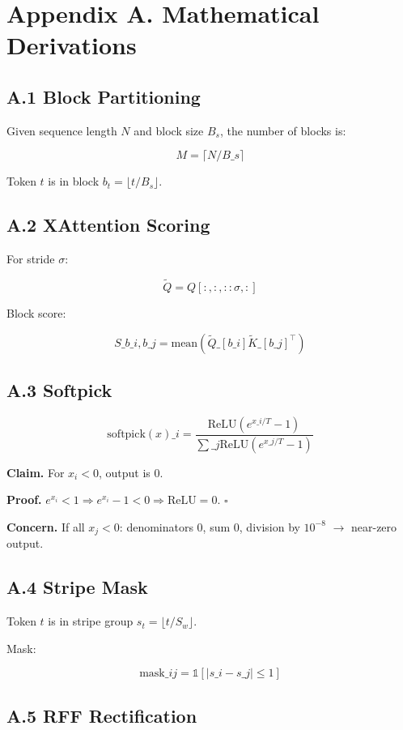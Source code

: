 \section{Appendix A. Mathematical Derivations}

\subsection{A.1 Block Partitioning}

Given sequence length $N$ and block size $B_s$, the number of blocks is:

\[
M = \lceil N / B\_s \rceil
\tag{A.1}
\]

Token $t$ is in block $b_t = \lfloor t / B_s \rfloor$.

\subsection{A.2 XAttention Scoring}

For stride $\sigma$:

\[
\tilde{Q} = Q[:, :, ::\sigma, :]
\tag{A.2}
\]

Block score:

\[
S\_{b\_i, b\_j} = \text{mean}(\tilde{Q}\_{[b\_i]} \tilde{K}\_{[b\_j]}^\top)
\tag{A.3}
\]

\subsection{A.3 Softpick}

\[
\text{softpick}(x)\_i = \frac{\text{ReLU}(e^{x\_i/T} - 1)}{\sum\_j \text{ReLU}(e^{x\_j/T} - 1)}
\tag{A.4}
\]

\textbf{Claim.} For $x_i < 0$, output is 0.

\textbf{Proof.} $e^{x_i} < 1 \Rightarrow e^{x_i} - 1 < 0 \Rightarrow \text{ReLU} = 0$. $\square$

\textbf{Concern.} If all $x_j < 0$: denominators 0, sum 0, division by $10^{-8}$ $\to$ 
near-zero output.

\subsection{A.4 Stripe Mask}

Token $t$ is in stripe group $s_t = \lfloor t / S_w \rfloor$.

Mask:

\[
\text{mask}\_{ij} = \mathbb{1}[|s\_i - s\_j| \leq 1]
\tag{A.5}
\]

\subsection{A.5 RFF Rectification}

